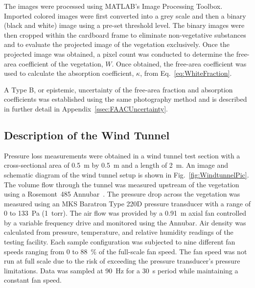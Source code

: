 \documentclass[12pt]{article}
\begin{document}
The images were processed using MATLAB's Image Processing Toolbox. Imported colored images were first converted into a grey scale and then a binary (black and white) image using a pre-set threshold level. The binary images were then cropped within the cardboard frame to eliminate non-vegetative substances and to evaluate the projected image of the vegetation exclusively. Once the projected image was obtained, a pixel count was conducted to determine the free-area coefficient of the vegetation, $W$. Once obtained, the free-area coefficient was used to calculate the absorption coefficient, $\kappa$, from Eq.~\ref{eq:WhiteFraction}.

A Type B, or epistemic, uncertainty of the free-area fraction and absorption coefficients was established using the same photography method and is described in further detail in Appendix~\ref{ssec:FAACUncertainty}.

\subsection{Description of the Wind Tunnel}
\label{ssec:headingscap}

Pressure loss measurements were obtained in a wind tunnel test section with a cross-sectional area of 0.5~\si{m} by 0.5~\si{m} and a length of 2~\si{m}. An image and schematic diagram of the wind tunnel setup is shown in Fig.~\ref{fig:WindtunnelPic}. The volume flow through the tunnel was measured upstream of the vegetation using a Rosemont~485 Annubar~\cite{Annubar}. The pressure drop across the vegetation was measured using an MKS Baratron Type 220D pressure transducer with a range of 0 to 133~Pa (1~torr). The air flow was provided by a 0.91~m axial fan controlled by a variable frequency drive and monitored using the Annubar. Air density was calculated from pressure, temperature, and relative humidity readings of the testing facility. Each sample configuration was subjected to nine different fan speeds ranging from 0 to 88~\% of the full-scale fan speed. The fan speed was not run at full scale due to the risk of exceeding the pressure transducer's pressure limitations. Data was sampled at 90~\si{Hz} for a 30~\si{s} period while maintaining a constant fan speed.
\end{document}
